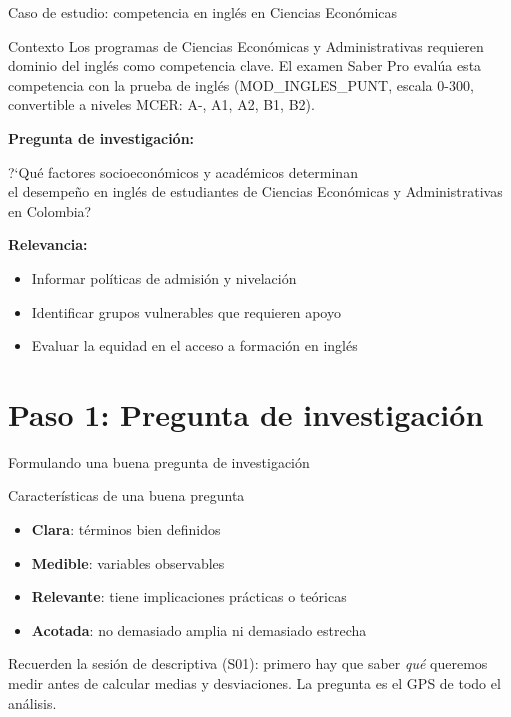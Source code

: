 \documentclass[aspectratio=169, 11pt]{beamer}
\begin{document}
\begin{frame}{Caso de estudio: competencia en inglés en Ciencias Econ\'omicas}
\begin{block}{Contexto}
Los programas de Ciencias Econ\'omicas y Administrativas requieren dominio del inglés como competencia clave. El examen Saber Pro evalúa esta competencia con la prueba de inglés (MOD\_INGLES\_PUNT, escala 0-300, convertible a niveles MCER: A-, A1, A2, B1, B2).
\end{block}

\vspace{0.2cm}
\textbf{Pregunta de investigaci\'on:}
\begin{center}
\large
\textcolor{javeriana}{?`Qu\'e factores socioecon\'omicos y acad\'emicos determinan\\el desempe\~no en ingl\'es de estudiantes de Ciencias Econ\'omicas y Administrativas\\en Colombia?}
\end{center}

\vspace{0.2cm}
\textbf{Relevancia:}
\begin{itemize}
\item Informar pol\'iticas de admisi\'on y nivelaci\'on
\item Identificar grupos vulnerables que requieren apoyo
\item Evaluar la equidad en el acceso a formaci\'on en ingl\'es
\end{itemize}
\end{frame}

\section{Paso 1: Pregunta de investigaci\'on}

\begin{frame}{Formulando una buena pregunta de investigación}
\begin{block}{Caracter\'isticas de una buena pregunta}
\begin{itemize}\setlength{\itemsep}{0pt}
\item \textbf{Clara}: t\'erminos bien definidos
\item \textbf{Medible}: variables observables
\item \textbf{Relevante}: tiene implicaciones pr\'acticas o te\'oricas
\item \textbf{Acotada}: no demasiado amplia ni demasiado estrecha
\end{itemize}
\end{block}

\small
Recuerden la sesi\'on de descriptiva (S01): primero hay que saber \textit{qu\'e} queremos medir antes de calcular medias y desviaciones. La pregunta es el GPS de todo el an\'alisis.
\end{frame}
\end{document}
